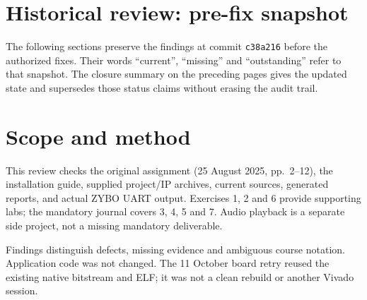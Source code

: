 \documentclass[11pt,a4paper]{article}
\begin{document}


\newpage
\section*{Historical review: pre-fix snapshot}
The following sections preserve the findings at commit \texttt{c38a216} before
the authorized fixes. Their words ``current'', ``missing'' and ``outstanding''
refer to that snapshot. The closure summary on the preceding pages gives the
updated state and supersedes those status claims without erasing the audit trail.


\section*{Scope and method}
This review checks the original assignment (25 August 2025, pp.~2--12),
the installation guide, supplied project/IP archives, current sources,
generated reports, and actual ZYBO UART output. Exercises 1, 2 and 6 provide
supporting labs; the mandatory journal covers 3, 4, 5 and 7. Audio playback
is a separate side project, not a missing mandatory deliverable.

Findings distinguish defects, missing evidence and ambiguous course notation.
Application code was not changed. The 11 October board retry reused the existing
native bitstream and ELF; it was not a clean rebuild or another Vivado session.
\end{document}
